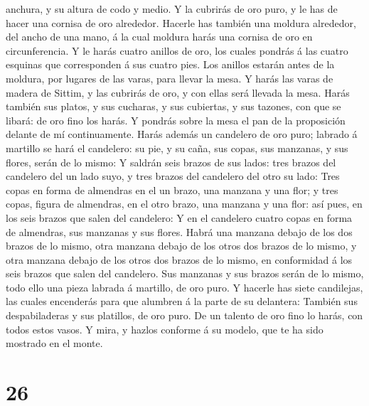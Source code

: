 anchura, y su altura de codo y medio.  Y la cubrirás de oro
puro, y le has de hacer una cornisa de oro alrededor. 
Hacerle has también una moldura alrededor, del ancho de una mano, á la
cual moldura harás una cornisa de oro en circunferencia.  Y
le harás cuatro anillos de oro, los cuales pondrás á las cuatro esquinas
que corresponden á sus cuatro pies.  Los anillos estarán
antes de la moldura, por lugares de las varas, para llevar la mesa.
 Y harás las varas de madera de Sittim, y las cubrirás de
oro, y con ellas será llevada la mesa.  Harás también sus
platos, y sus cucharas, y sus cubiertas, y sus tazones, con que se
libará: de oro fino los harás.  Y pondrás sobre la mesa el
pan de la proposición delante de mí continuamente.  Harás
además un candelero de oro puro; labrado á martillo se hará el
candelero: su pie, y su caña, sus copas, sus manzanas, y sus flores,
serán de lo mismo:  Y saldrán seis brazos de sus lados:
tres brazos del candelero del un lado suyo, y tres brazos del candelero
del otro su lado:  Tres copas en forma de almendras en el
un brazo, una manzana y una flor; y tres copas, figura de almendras, en
el otro brazo, una manzana y una flor: así pues, en los seis brazos que
salen del candelero:  Y en el candelero cuatro copas en
forma de almendras, sus manzanas y sus flores.  Habrá una
manzana debajo de los dos brazos de lo mismo, otra manzana debajo de los
otros dos brazos de lo mismo, y otra manzana debajo de los otros dos
brazos de lo mismo, en conformidad á los seis brazos que salen del
candelero.  Sus manzanas y sus brazos serán de lo mismo,
todo ello una pieza labrada á martillo, de oro puro.  Y
hacerle has siete candilejas, las cuales encenderás para que alumbren á
la parte de su delantera:  También sus despabiladeras y sus
platillos, de oro puro.  De un talento de oro fino lo
harás, con todos estos vasos.  Y mira, y hazlos conforme á
su modelo, que te ha sido mostrado en el monte.

\hypertarget{section-25}{%
\section{26}\label{section-25}}

